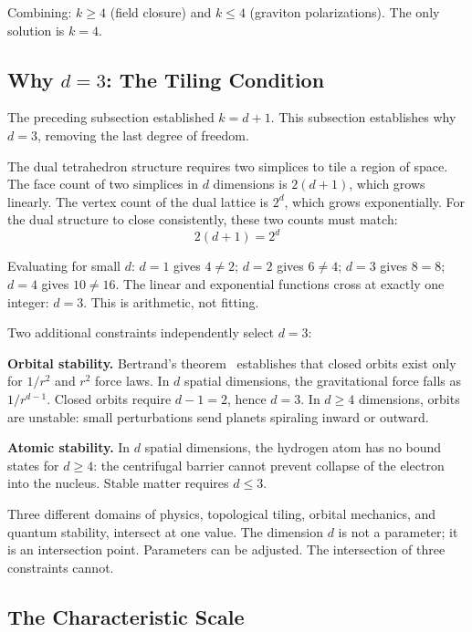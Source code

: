 \documentclass[aps,prd,preprint,superscriptaddress,showpacs,preprintnumbers,amsmath,amssymb,nofootinbib]{revtex4-2}
\begin{document}
Combining: $k \geq 4$ (field closure) and $k \leq 4$ (graviton polarizations). The only solution is $k = 4$.

\subsection{Why $d = 3$: The Tiling Condition}
\label{subsec:d3}

The preceding subsection established $k = d + 1$. This subsection establishes why $d = 3$, removing the last degree of freedom.

The dual tetrahedron structure requires two simplices to tile a region of space. The face count of two simplices in $d$ dimensions is $2(d+1)$, which grows linearly. The vertex count of the dual lattice is $2^d$, which grows exponentially. For the dual structure to close consistently, these two counts must match:
\begin{equation}
2(d+1) = 2^d
\label{eq:tiling}
\end{equation}

Evaluating for small $d$: $d = 1$ gives $4 \neq 2$; $d = 2$ gives $6 \neq 4$; $d = 3$ gives $8 = 8$; $d = 4$ gives $10 \neq 16$. The linear and exponential functions cross at exactly one integer: $d = 3$. This is arithmetic, not fitting.

Two additional constraints independently select $d = 3$:

\textbf{Orbital stability.} Bertrand's theorem~\cite{goldstein2002} establishes that closed orbits exist only for $1/r^2$ and $r^2$ force laws. In $d$ spatial dimensions, the gravitational force falls as $1/r^{d-1}$. Closed orbits require $d - 1 = 2$, hence $d = 3$. In $d \geq 4$ dimensions, orbits are unstable: small perturbations send planets spiraling inward or outward.

\textbf{Atomic stability.} In $d$ spatial dimensions, the hydrogen atom has no bound states for $d \geq 4$: the centrifugal barrier cannot prevent collapse of the electron into the nucleus. Stable matter requires $d \leq 3$.

Three different domains of physics, topological tiling, orbital mechanics, and quantum stability, intersect at one value. The dimension $d$ is not a parameter; it is an intersection point. Parameters can be adjusted. The intersection of three constraints cannot.

\subsection{The Characteristic Scale}
\label{subsec:scale}
\end{document}
